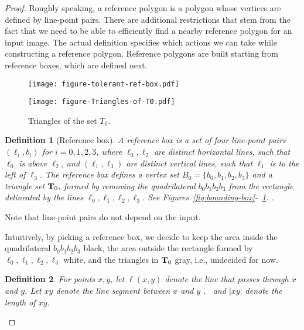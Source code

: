 \documentclass[11pt,english]{article}
\newtheorem{definition}{Definition}[section]
\numberwithin{figure}{section}
\newcommand{\Tstart}{{\bf T}_0}
\begin{document}
\begin{proof}
Roughly speaking, a reference polygon is a polygon whose vertices are defined by line-point pairs. There are additional restrictions that stem from the fact that we need to be able to efficiently find a nearby reference polygon for an input image. The actual definition specifies which actions we can take while constructing a reference polygon. Reference polygons are built starting from reference boxes, which are defined next.

\ifnum{}
\begin{figure}[ht]
\begin{minipage}[b]{0.45\linewidth}
\centering
\texttt{[image: figure-tolerant-ref-box.pdf]}
\caption{ A reference box.}
\label{fig:bounding-box}
\end{minipage}
\hspace{0.1\linewidth}
\begin{minipage}[b]{0.45\linewidth}
\centering
\texttt{[image: figure-Triangles-of-T0.pdf]}
\caption{ Triangles of the set $T_0$.}
\label{fig:triangles-T0}
\end{minipage}
\end{figure}
\fi


\begin{definition}[Reference box]\label{def:reference-box}
A {\em reference box} is a set of four line-point pairs $(\ell_i,b_i)$ for $i=0,1,2,3$, where $\ell_0,\ell_2$ are distinct horizontal lines, such that $\ell_0$ is above $\ell_2$, and $(\ell_1,\ell_3)$ are distinct vertical lines, such that $\ell_1$ is to the left of $\ell_3$. The reference box defines a vertex set $B_0=\{b_0,b_1,b_2,b_3\}$ and a triangle set $\Tstart,$ formed by removing the quadrilateral $b_0b_1b_2b_3$ from the rectangle delineated by the lines $\ell_0,\ell_1,\ell_2,\ell_3$\ifnum{}.
See Figures~\ref{fig:bounding-box}-~\ref{fig:triangles-T0}.
\else
.
\fi
\end{definition}
\ifnum{}
Note that line-point pairs do not depend on the input.
\else

\fi
Intuitively, by picking a reference box, we decide to keep the area inside the quadrilateral $b_0b_1b_2b_3$ black, the area outside the rectangle formed by $\ell_0,\ell_1,\ell_2,\ell_3$ white, and the triangles in $\Tstart$ gray, i.e., undecided for now.

\begin{definition}
For points $x,y$, let $\ell(x,y)$ denote the line that passes through $x$ and $y$. Let $xy$ denote the line segment between $x$ and $y$\ifnum{} . \else\ and $|xy|$ denote the length of $xy$.\fi
\end{definition}


\end{proof}
\end{document}
